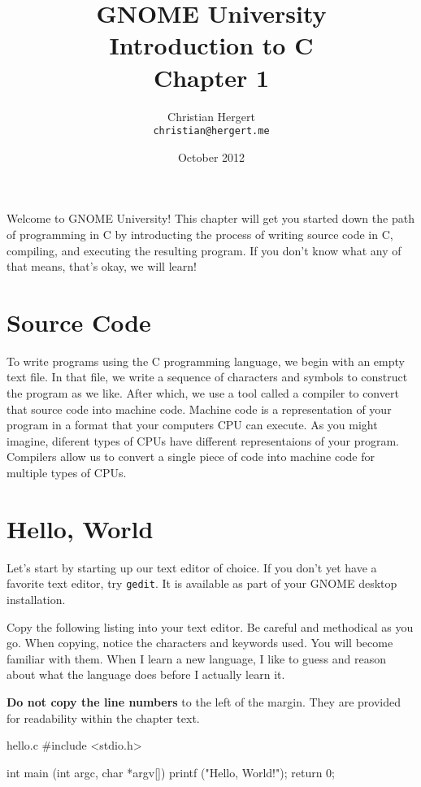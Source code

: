 \documentclass[12pt]{article}
\title{GNOME University \\
Introduction to C \\
Chapter 1}
\author{Christian Hergert \\
    \small \texttt{christian@hergert.me}
}
\date{October 2012}
\begin{document}
\maketitle

Welcome to GNOME University! This chapter will get you started down the path of
programming in C by introducting the process of writing source code in C,
compiling, and executing the resulting program. If you don't know what any of
that means, that's okay, we will learn!

\section{Source Code}

To write programs using the C programming language, we begin with an empty text
file. In that file, we write a sequence of characters and symbols to construct
the program as we like. After which, we use a tool called a compiler to convert
that source code into machine code. Machine code is a representation of your
program in a format that your computers CPU can execute. As you might imagine,
diferent types of CPUs have different representaions of your program. Compilers
allow us to convert a single piece of code into machine code for multiple types
of CPUs.

\section{Hello, World}

Let's start by starting up our text editor of choice. If you don't yet have a
favorite text editor, try \verb|gedit|. It is available as part of your GNOME
desktop installation.

Copy the following listing into your text editor. Be careful and methodical as
you go. When copying, notice the characters and keywords used.  You will become
familiar with them. When I learn a new language, I like to guess and reason
about what the language does before I actually learn it.

\textbf{Do not copy the line numbers} to the left of the margin. They are
provided for readability within the chapter text.

\begin{code}{hello.c}
#include <stdio.h>

int
main (int   argc,
      char *argv[])
{
    printf ("Hello, World!\n");
    return 0;
}
\end{code}
\end{document}
